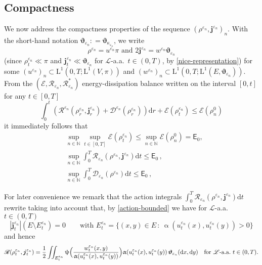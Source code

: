 \documentclass[11pt,reqno]{amsart}
\numberwithin{equation}{section}
\newcommand{\N}{\mathbb{N}}
\newcommand{\scrL}{\mathscr{L}}
\newcommand{\eps}{\varepsilon}
\newcommand{\dd}{\mathrm{d}}
\theoremstyle{definition}
\newcommand{\ep}{\varepsilon}
\let\eps\ep
\def\dd{\mathrm{d}}
\newcommand{\Fish}{\mathscr{D}}
\newcommand{\teta}{\boldsymbol \vartheta}
\newcommand{\tetapien}{\boldsymbol{\teta}_{\eps_n}}
\def\calS{\mathscr E}
\newcommand{\bj}{{\boldsymbol j}}
\newcommand{\scrR}{\mathscr{R}}
\newcommand{\scrD}{\mathscr{D}}
\newcommand{\scrE}{\mathscr{E}}
\newcommand{\ej}{\eps_n}
\newcommand{\rmL}{\mathrm{L}}
\newcommand{\RNEW}{\color{black}} %
\newcommand{\EEE}{\color{black}}
\numberwithin{equation}{section}
\begin{document}
\subsection{Compactness}
\label{ss:compactness}
We now address the  compactness properties of the sequence  $(\rho^{\ej},\bj^{\ej})_n $.
With the short-hand notation $ \tetapien : = \teta_{\kappa_{\eps_n}}$,
we write   
\begin{equation}
\label{absolute-continuity-n}
\rho^{\ej} = u^{\ej} \pi
\text{ and  } 2\bj^{\ej} = w^{\ej} \tetapien 
\end{equation}
 (since $\rho_t^{\ej} \ll \pi$ and $\bj_t^{\ej} \ll \tetapien$
for $\scrL$-a.a.\ $t\in (0,T)$, by 
 \eqref{nice-representation})
for some $(u^{\ej})_n  \subset
\rmL^1(0,T; \rmL^1(V,\pi)) $ and  \RNEW $(w^{\ej})_n \subset \rmL^1(0,T; \rmL^1(E,\tetapien)) $.   \EEE
From the $(\scrE,\scrR_{\eps_n},\scrR_{\ej}^*)$  energy-dissipation balance written on the interval $[0,t]$ for any $t\in [0,T]$
\begin{equation}
\label{EDB-n}
\int_0^t \left( \scrR^{\ej}(\rho_r^{\ej}, \bj_r^{\ej}) + \Fish^{\ej}(\rho_r^{\ej}) \right) \dd r+ \calS(\rho_t^{\ej})   \leq \calS(\rho^0_n) 
\end{equation}
  it immediately follows that 
 \begin{align}
  \label{energy-bounded}
  &
 \sup_{n\in \N }\sup_{t\in [0,T]} \scrE(\rho_t^{\ej})    \leq \sup_{n\in \N }\scrE(\rho_n^0) =\mathsf{E}_0,
 \\
 \label{action-bounded}
 &
 \sup_{n\in \N} \int_0^T \scrR_{\eps_n}(\rho^{\ej}, \bj^{\ej}) \dd t \leq \mathsf{E}_0\,,
 \\
  \label{Fisher-bounded}
 &
 \sup_{n\in \N} \int_0^T \scrD_{\eps_n}(\rho^{\ej}) \dd t \leq \mathsf{E}_0\,,
 \end{align}
\par
For later convenience we remark that the action 
integrals $ \int_0^T \scrR_{\eps_n}(\rho^{\ej}, \bj^{\ej}) \dd t $ rewrite
taking into account that, by  \eqref{action-bounded}
 we have for $\scrL$-a.a.\ $t\in (0,T)$
 \begin{equation}
 \label{def-set-Eeps}
 |\bj_t^{\ej} |(E\setminus E_t^{\ej}) =0 \qquad \text{with }  E_t^{\ej} =  \{ (x,y)\in E\, : \ \upalpha(u_t^{\ej}(x),u_t^{\ej}(y))>0\}
 \end{equation}
 and hence
 \[
 \scrR(\rho_t^{\ej},\bj_t^{\ej})  = 
    \displaystyle
    \frac12\iint_{E_t^{\ej}}%
    \uppsi\Bigl(\frac{w_t^{\ej}(x,y)}{\upalpha(u_t^{\ej}(x),u_t^{\ej}(y))}\Bigr)\upalpha(u_t^{\ej}(x),u_t^{\ej}(y))\,\tetapien(\dd
    x,\dd y) \EEE 
     \quad \text{for $\scrL$-a.a.\ $t\in (0,T)$.} 
 \] 
\end{document}
